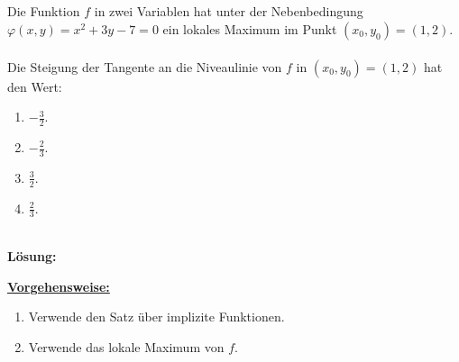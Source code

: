 \subsection*{}
Die Funktion $ f $ in zwei Variablen hat unter der Nebenbedingung $ \varphi(x,y) = x^2 + 3 y - 7 = 0 $ ein lokales Maximum im Punkt $ (x_0,y_0) = (1,2) $.\\
\\
Die Steigung der Tangente  an die Niveaulinie von $ f $ in $ (x_0,y_0) = (1,2) $ hat den Wert:
\renewcommand{\labelenumi}{(\alph{enumi})}
\begin{enumerate}
	\item 
	$-\frac{3}{2}$.
	\item 
	$-\frac{2}{3}$.
	\item 
	$\frac{3}{2}$.
	\item
	$\frac{2}{3}$.
\end{enumerate}
\ \\
\textbf{Lösung:}
\begin{mdframed}
\underline{\textbf{Vorgehensweise:}}
\renewcommand{\labelenumi}{\theenumi.}
\begin{enumerate}
\item Verwende den Satz über implizite Funktionen.
\item Verwende das lokale Maximum von $ f $.
\end{enumerate}
\end{mdframed}

